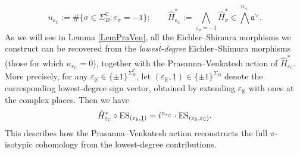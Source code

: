 \documentclass{amsart}
\theoremstyle{definition}
\theoremstyle{remark}
\numberwithin{equation}{section}
\newcommand{\C}{{\mathbb C}}
\newcommand{\R}{{\mathbb R}}
\begin{document}
\[
n_{\varepsilon_\C}:=\#\{\sigma\in \Sigma_B^\C\colon \varepsilon_\sigma=-1\};\qquad \hat H_{\varepsilon_\C}^\ast:=\bigwedge_{\varepsilon_\sigma=-1}\hat H_\sigma^\ast\in \bigwedge^{n_{\varepsilon_\C}}\mathfrak{a}^\vee.
\]
As we will see in Lemma \ref{LemPraVen}, all the Eichler--Shimura morphisms we construct can be recovered from the \emph{lowest-degree} Eichler--Shimura morphisms (those for which $n_{\varepsilon_\C} = 0$), together with the Prasanna--Venkatesh action of $\hat H_{\varepsilon_\C}^\ast$. More precisely, for any $\varepsilon_\R \in \{\pm1\}^{\Sigma_B^\R}$, let $(\varepsilon_\R, \underline{1}) \in \{\pm1\}^{\Sigma_B}$ denote the corresponding lowest-degree sign vector, obtained by extending $\varepsilon_\R$ with ones at the complex places. Then we have 
\begin{equation}\label{P-Vaction}
\hat H_{\varepsilon_\C}^\ast \circ {\rm ES}_{(\varepsilon_\R, \underline{1})} = i^{n_{\varepsilon_\C}} \cdot {\rm ES}_{(\varepsilon_\R, \varepsilon_\C)}.
 \end{equation} 
This describes how the Prasanna--Venkatesh action reconstructs the full $\pi$-isotypic cohomology from the lowest-degree contributions.
\end{document}
